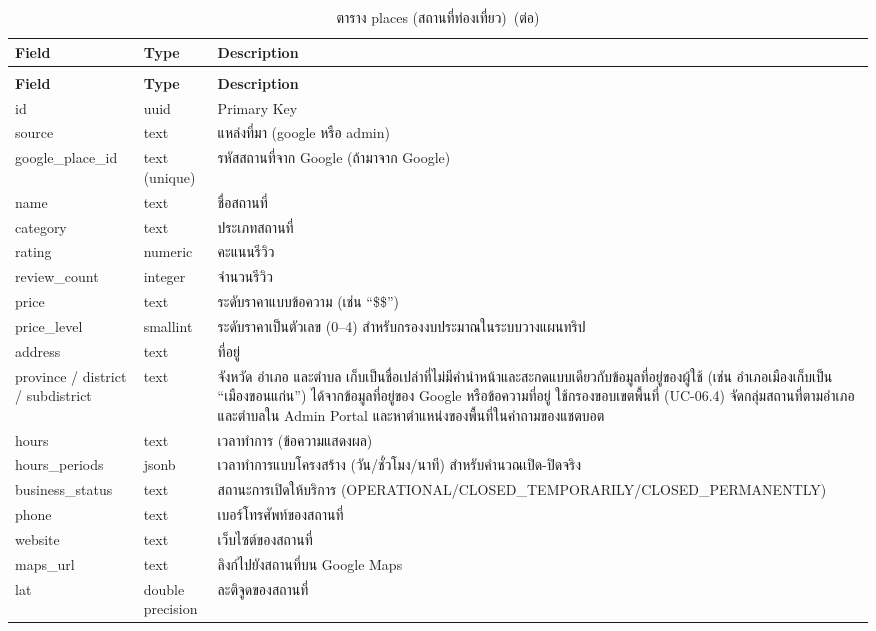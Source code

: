 {\small
\begin{longtable}{|p{3.6cm}|p{2.6cm}|p{6.8cm}|}
\caption{ตาราง places (สถานที่ท่องเที่ยว)}\label{tab:db_place}\\
\hline
\textbf{Field} & \textbf{Type} & \textbf{Description} \\
\hline
\endfirsthead
\caption[]{ตาราง places (สถานที่ท่องเที่ยว)~(\textnormal{ต่อ})}\\
\hline
\textbf{Field} & \textbf{Type} & \textbf{Description} \\
\hline
\endhead
id & uuid & Primary Key \\ \hline
source & text & แหล่งที่มา (google หรือ admin) \\ \hline
google\_place\_id & text (unique) & รหัสสถานที่จาก Google (ถ้ามาจาก Google) \\ \hline
name & text & ชื่อสถานที่ \\ \hline
category & text & ประเภทสถานที่ \\ \hline
rating & numeric & คะแนนรีวิว \\ \hline
review\_count & integer & จำนวนรีวิว \\ \hline
price & text & ระดับราคาแบบข้อความ (เช่น ``\$\$'') \\ \hline
price\_level & smallint & ระดับราคาเป็นตัวเลข (0--4) สำหรับกรองงบประมาณในระบบวางแผนทริป \\ \hline
address & text & ที่อยู่ \\ \hline
province / district / subdistrict & text & จังหวัด อำเภอ และตำบล เก็บเป็นชื่อเปล่าที่ไม่มีคำนำหน้าและสะกดแบบเดียวกับข้อมูลที่อยู่ของผู้ใช้ (เช่น อำเภอเมืองเก็บเป็น ``เมืองขอนแก่น'') ได้จากข้อมูลที่อยู่ของ Google หรือข้อความที่อยู่ ใช้กรองขอบเขตพื้นที่ (UC-06.4) จัดกลุ่มสถานที่ตามอำเภอและตำบลใน Admin Portal และหาตำแหน่งของพื้นที่ในคำถามของแชตบอต \\ \hline
hours & text & เวลาทำการ (ข้อความแสดงผล) \\ \hline
hours\_periods & jsonb & เวลาทำการแบบโครงสร้าง (วัน/ชั่วโมง/นาที) สำหรับคำนวณเปิด-ปิดจริง \\ \hline
business\_status & text & สถานะการเปิดให้บริการ (OPERATIONAL/CLOSED\_TEMPORARILY/CLOSED\_PERMANENTLY) \\ \hline
phone & text & เบอร์โทรศัพท์ของสถานที่ \\ \hline
website & text & เว็บไซต์ของสถานที่ \\ \hline
maps\_url & text & ลิงก์ไปยังสถานที่บน Google Maps \\ \hline
lat & double precision & ละติจูดของสถานที่ \\ \hline

\end{longtable}}
